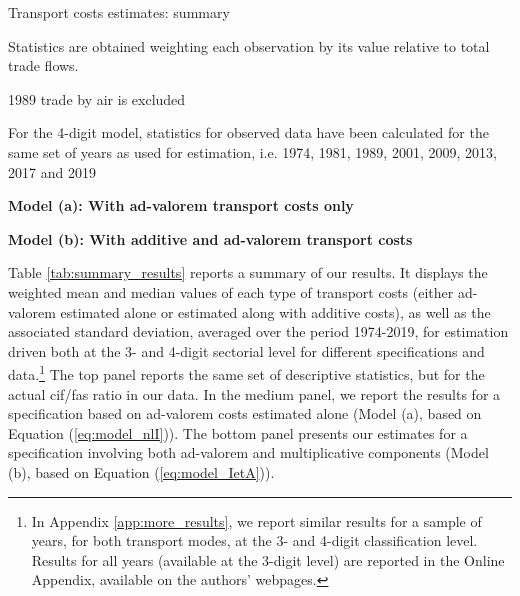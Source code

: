 \documentclass[a4paper,11pt]{article}
\begin{document}
\begin{table}[htbp]
 \centering
\caption{Transport costs estimates: summary} \vspace{5mm} \label{tab:summary_results}
	
		\begin{tablenotes}
		\tiny
		\item Statistics are obtained weighting each observation by its value relative to total trade flows.
		\item 1989 trade by air is excluded
		\item For the  4-digit model, statistics for observed data have been calculated for the same set of years as used for estimation, i.e.
		1974, 1981, 1989, 2001, 2009, 2013, 2017 and 2019
		\item \textbf{Model (a): With ad-valorem transport costs only}
		\item \textbf{Model (b): With additive and ad-valorem transport costs}
	\end{tablenotes}
\end{table}

Table \ref{tab:summary_results} reports a summary of our results.
It displays the weighted mean and median values of each type of transport costs (either ad-valorem estimated alone or estimated along with additive costs), as well as the associated standard deviation, averaged over the period 1974-2019, for estimation driven both at the 3- and 4-digit sectorial level for different specifications and data.\footnote{In Appendix \ref{app:more_results}, we report similar results for a sample of years, for both transport modes, at the 3- and 4-digit classification level. Results for all years (available at the 3-digit level) are reported in the Online Appendix, available on the authors' webpages.}
The top panel reports the same set of descriptive statistics, but for the actual cif/fas ratio in our data. In the medium panel, we report the results for a specification based on ad-valorem costs estimated alone (Model (a), based on Equation (\ref{eq:model_nlI})). The bottom panel presents our estimates for a specification involving both ad-valorem and multiplicative components (Model (b), based on Equation (\ref{eq:model_IetA})).
\end{document}
